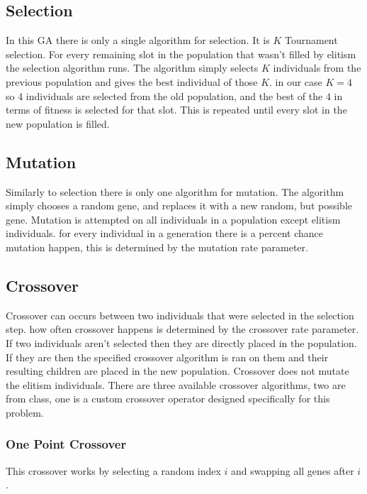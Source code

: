 \documentclass[conference]{IEEEtran}
\begin{document}
\subsection{Selection}
In this GA there is only a single algorithm for selection. It is $K$ Tournament selection. For every remaining slot in the population that wasn't filled by elitism the selection algorithm runs. The algorithm simply selects $K$ individuals from the previous population and gives the best individual of those $K$. in our case $K=4$ so 4 individuals are selected from the old population, and the best of the $4$ in terms of fitness is selected for that slot. This is repeated until every slot in the new population is filled.   


\subsection{Mutation}
Similarly to selection there is only one algorithm for mutation. The algorithm simply chooses a random gene, and replaces it with a new random, but possible gene. Mutation is attempted on all individuals in a population except elitism individuals. for every individual in a generation there is a percent chance mutation happen, this is determined by the mutation rate parameter. 

\subsection{Crossover}
Crossover can occurs between two individuals that were selected in the selection step. how often crossover happens is determined by the crossover rate parameter. If two individuals aren't selected then they are directly placed in the population. If they are then the specified crossover algorithm is ran on them and their resulting children are placed in the new population. Crossover does not mutate the elitism individuals. There are three available crossover algorithms, two are from class, one is a custom crossover operator designed specifically for this problem.

\subsubsection{One Point Crossover} This crossover works by selecting a random index $i$ and swapping all genes after $i$. 
\begin{center}

\end{center}
\end{document}
